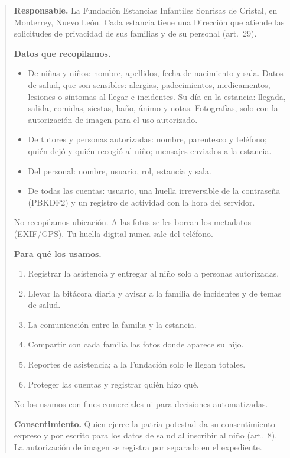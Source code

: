 \begin{quote}\small
\textbf{Responsable.} La Fundación Estancias Infantiles Sonrisas de Cristal, en Monterrey, Nuevo León. Cada estancia tiene una Dirección que atiende las solicitudes de privacidad de sus familias y de su personal (art.~29).

\textbf{Datos que recopilamos.}
\begin{itemize}
	\item De niñas y niños: nombre, apellidos, fecha de nacimiento y sala. Datos de salud, que son sensibles: alergias, padecimientos, medicamentos, lesiones o síntomas al llegar e incidentes. Su día en la estancia: llegada, salida, comidas, siestas, baño, ánimo y notas. Fotografías, solo con la autorización de imagen para el uso autorizado.
	\item De tutores y personas autorizadas: nombre, parentesco y teléfono; quién dejó y quién recogió al niño; mensajes enviados a la estancia.
	\item Del personal: nombre, usuario, rol, estancia y sala.
	\item De todas las cuentas: usuario, una huella irreversible de la contraseña (PBKDF2) y un registro de actividad con la hora del servidor.
\end{itemize}
No recopilamos ubicación. A las fotos se les borran los metadatos (EXIF/GPS). Tu huella digital nunca sale del teléfono.

\textbf{Para qué los usamos.}
\begin{enumerate}
	\item Registrar la asistencia y entregar al niño solo a personas autorizadas.
	\item Llevar la bitácora diaria y avisar a la familia de incidentes y de temas de salud.
	\item La comunicación entre la familia y la estancia.
	\item Compartir con cada familia las fotos donde aparece su hijo.
	\item Reportes de asistencia; a la Fundación solo le llegan totales.
	\item Proteger las cuentas y registrar quién hizo qué.
\end{enumerate}
No los usamos con fines comerciales ni para decisiones automatizadas.

\textbf{Consentimiento.} Quien ejerce la patria potestad da su consentimiento expreso y por escrito para los datos de salud al inscribir al niño (art.~8). La autorización de imagen se registra por separado en el expediente.


\end{quote}
